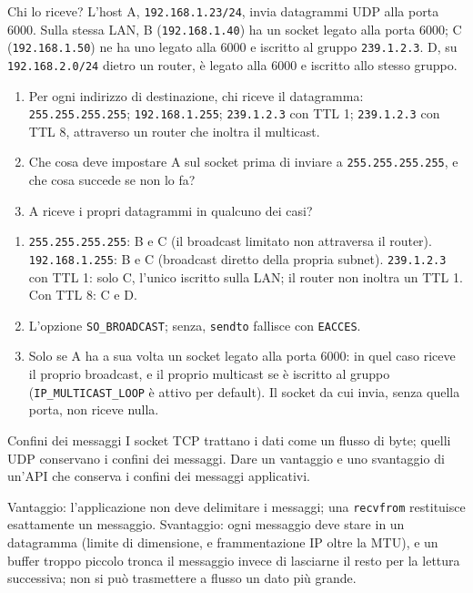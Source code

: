 \begin{esercizio}{Chi lo riceve?}
L'host A, \texttt{192.168.1.23/24}, invia datagrammi UDP alla porta 6000. Sulla stessa LAN, B (\texttt{192.168.1.40}) ha un socket legato
alla porta 6000; C (\texttt{192.168.1.50}) ne ha uno legato alla 6000 e iscritto al gruppo \texttt{239.1.2.3}. D, su
\texttt{192.168.2.0/24} dietro un router, è legato alla 6000 e iscritto allo stesso gruppo.
\begin{enumerate}[label=(\alph*)]
    \item Per ogni indirizzo di destinazione, chi riceve il datagramma: \texttt{255.255.255.255}; \texttt{192.168.1.255};
          \texttt{239.1.2.3} con TTL 1; \texttt{239.1.2.3} con TTL 8, attraverso un router che inoltra il multicast.
    \item Che cosa deve impostare A sul socket prima di inviare a \texttt{255.255.255.255}, e che cosa succede se non lo fa?
    \item A riceve i propri datagrammi in qualcuno dei casi?
\end{enumerate}

\svolgimento
\begin{enumerate}[label=(\alph*)]
    \item \texttt{255.255.255.255}: B e C (il broadcast limitato non attraversa il router). \texttt{192.168.1.255}: B e C (broadcast
          diretto della propria subnet). \texttt{239.1.2.3} con TTL 1: solo C, l'unico iscritto sulla LAN; il router non inoltra un TTL 1.
          Con TTL 8: C e D.
    \item L'opzione \texttt{SO\_BROADCAST}; senza, \texttt{sendto} fallisce con \texttt{EACCES}.
    \item Solo se A ha a sua volta un socket legato alla porta 6000: in quel caso riceve il proprio broadcast, e il proprio multicast se è
          iscritto al gruppo (\texttt{IP\_MULTICAST\_LOOP} è attivo per default). Il socket da cui invia, senza quella porta, non riceve
          nulla.
\end{enumerate}
\end{esercizio}

\begin{esercizio}{Confini dei messaggi}
I socket TCP trattano i dati come un flusso di byte; quelli UDP conservano i confini dei messaggi. Dare un vantaggio e uno svantaggio di
un'API che conserva i confini dei messaggi applicativi.

\svolgimento
Vantaggio: l'applicazione non deve delimitare i messaggi; una \texttt{recvfrom} restituisce esattamente un messaggio. Svantaggio: ogni
messaggio deve stare in un datagramma (limite di dimensione, e frammentazione IP oltre la MTU), e un buffer troppo piccolo tronca il
messaggio invece di lasciarne il resto per la lettura successiva; non si può trasmettere a flusso un dato più grande.
\end{esercizio}

